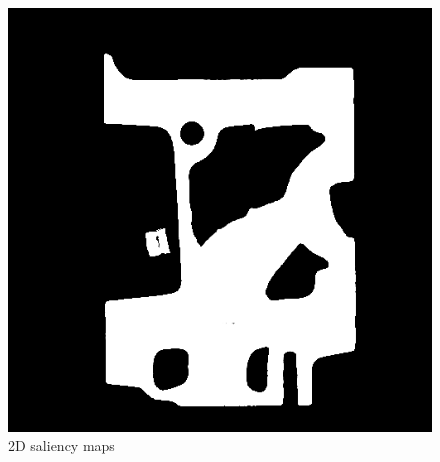 \begin{figure}
\begin{minipage}{.33\textwidth}
		\subcaption{}
	\end{minipage}~
	\begin{minipage}{.33\textwidth}
		\includegraphics[width=1\linewidth]{images/engine_naive_saliencemap_2_overlap}
		\subcaption{}
	\end{minipage}
	\caption{2D saliency maps \cite{itti_model_1998}}
	\label{fig:engine_naive_saliencemap}
\end{figure}

